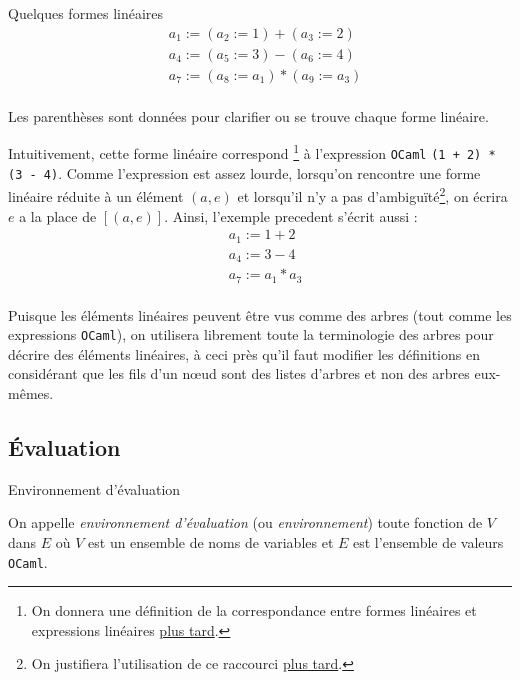 \begin{example}
    Quelques formes linéaires
    \begin{align*}
         & a_1 := (a_2 := 1) + (a_3 := 2)     \\
         & a_4 := (a_5 := 3) - (a_6 := 4)     \\
         & a_7 := (a_8 := a_1) * (a_9 := a_3) \\
    \end{align*}

    Les parenthèses sont données pour clarifier ou se trouve chaque forme
    linéaire.

    Intuitivement, cette forme linéaire correspond \footnote{
        On donnera une définition de la correspondance entre formes
        linéaires et expressions linéaires \hyperref[definition_correspondance]{plus tard}.
    } à l'expression
    \texttt{OCaml} \texttt{(1 + 2) * (3 - 4)}. Comme l'expression est assez
    lourde, lorsqu'on rencontre une forme linéaire réduite à un élément
    $(a, e)$ et lorsqu'il n'y a pas d'ambiguïté\footnote{
        On justifiera l'utilisation de ce raccourci
        \hyperref[justification_notation_forme_lineaire_simple]{plus tard}.
    }, on écrira $e$ a la place de
    $[(a, e)]$. Ainsi, l'exemple precedent s'écrit aussi :
    \begin{align*}
         & a_1 := 1 + 2     \\
         & a_4 := 3 - 4     \\
         & a_7 := a_1 * a_3 \\
    \end{align*}
\end{example}

\begin{remark}
    Puisque les éléments linéaires peuvent être vus comme des arbres (tout comme
    les expressions \texttt{OCaml}), on utilisera librement toute la
    terminologie des arbres pour décrire des éléments linéaires, à ceci près
    qu'il faut modifier les définitions en considérant que les fils d'un
    n{\oe}ud sont des listes d'arbres et non des arbres eux-mêmes.
\end{remark}

\subsection{Évaluation}

\begin{definition}
    Environnement d'évaluation

    On appelle \textit{environnement d'évaluation} (ou \textit{environnement})
    toute fonction de $V$ dans $E$ o\`u $V$ est un ensemble de noms de variables
    et $E$ est l'ensemble de valeurs \texttt{OCaml}.
\end{definition}

